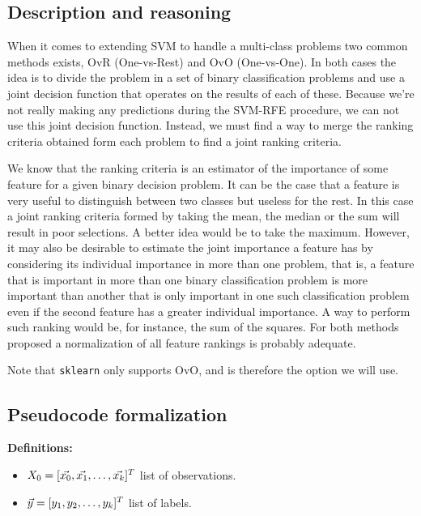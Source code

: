 \subsection{Description and reasoning}
\label{sec:stopCond.desc}

When it comes to extending SVM to handle a multi-class problems two common methods exists, OvR (One-vs-Rest) and OvO (One-vs-One). In both cases the idea is to divide the problem in a set of binary classification problems and use a joint decision function that operates on the results of each of these. Because we're not really making any predictions during the SVM-RFE procedure, we can not use this joint decision function. Instead, we must find a way to merge the ranking criteria obtained form each problem to find a joint ranking criteria.

We know that the ranking criteria is an estimator of the importance of some feature for a given binary decision problem. It can be the case that a feature is very useful to distinguish between two classes but useless for the rest. In this case a joint ranking criteria formed by taking the mean, the median or the sum will result in poor selections. A better idea would be to take the maximum. However, it may also be desirable to estimate the joint importance a feature has by considering its individual importance in more than one problem, that is, a feature that is important in more than one binary classification problem is more important than another that is only important in one such classification problem even if the second feature has a greater individual importance. A way to perform such ranking would be, for instance, the sum of the squares. For both methods proposed a normalization of all feature rankings is probably adequate.

Note that \texttt{sklearn} only supports OvO, and is therefore the option we will use.

\subsection{Pseudocode formalization}

\textbf{Definitions:}

\begin{itemize}
    \item $X_0 = [\vec{x_0}, \vec{x_1}, \dotsc, \vec{x_k}]^T$ list of observations.
    \item $\vec{y} = [y_1, y_2, \dotsc, y_k]^T$ list of labels.
\end{itemize}

